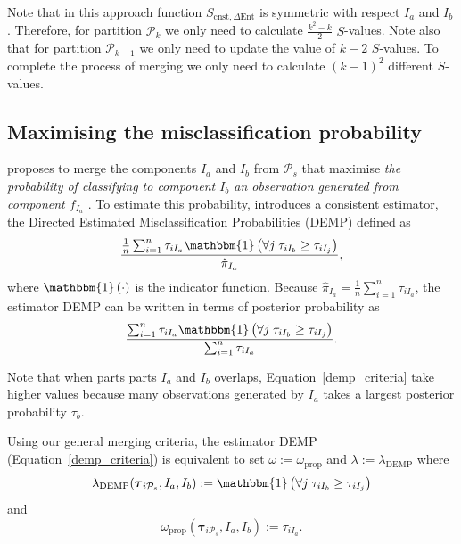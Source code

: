 \documentclass[submit]{smj}
\theoremstyle{definition}
\newcommand{\m}[1]{\boldsymbol{#1}}
\begin{document}
Note that in this approach function $S_{\text{cnst}, \Delta\text{Ent}}$ is symmetric with respect $I_a$ and $I_b$. Therefore, for partition $\mathcal{P}_k$ we only need to calculate $\frac{k^2-k}{2}$ $S$-values. Note also that for partition $\mathcal{P}_{k-1}$ we only need to update the value of $k-2$ $S$-values. To complete the process of merging we only need to calculate $(k-1)^2$ different $S$-values. 


\subsection{Maximising the misclassification probability}
\label{missclassification_section}

\cite{hennig2010methods} proposes to merge the components $I_a$ and $I_b$ from $ \mathcal{P}_s$ that maximise \emph{the probability of classifying to component $I_b$ an observation generated from component $f_{I_a}$ }. To estimate this probability,  \cite{hennig2010methods} introduces a consistent estimator, the Directed Estimated Misclassification Probabilities (DEMP) defined as
\[
\frac{ \frac{1}{n} \sum_{i=1}^n {\tau_{iI_a} \mathbbm{1}\left( \forall j\; \tau_{i I_{b}} \geq \tau_{iI_j} \right)}}{ \hat{\pi}_{I_a}},
\]
where $\mathbbm{1}\left( \cdot \right)$ is the indicator function. Because $ \hat{\pi}_{I_a} = \frac{1}{n} \sum_{i=1}^n \tau_{iI_a}$, the estimator DEMP can be written in terms of posterior probability as
\begin{equation}\label{demp_criteria}
\frac{ \sum_{i=1}^n {\tau_{iI_a} \mathbbm{1}\left( \forall j\; \tau_{i I_{b}} \geq \tau_{iI_j} \right)}}{\sum_{i=1}^n \tau_{iI_a} }.
\end{equation}

Note that when parts parts $I_a$ and $I_b$  overlaps, Equation~\ref{demp_criteria} take higher values because many observations generated by $I_a$ takes a largest posterior probability $\tau_b$.

Using our general merging criteria, the estimator DEMP (Equation~\ref{demp_criteria}) is equivalent to set $\omega :=\omega_{\text{prop}}$ and  $\lambda := \lambda_{\text{DEMP}}$ where
\begin{equation}\label{lambda_demp}
\lambda_{\text{DEMP}}(\m\tau_{i \mathcal{P}_s},  I_a,  I_b) := \mathbbm{1}\left( \forall j\; \tau_{i I_{b}} \geq \tau_{iI_j} \right)
\end{equation}
and
\[
\omega_{\text{prop}}(\m\tau_{i \mathcal{P}_s},  I_a,  I_b) :=  \tau_{iI_a}.
\]
\end{document}
